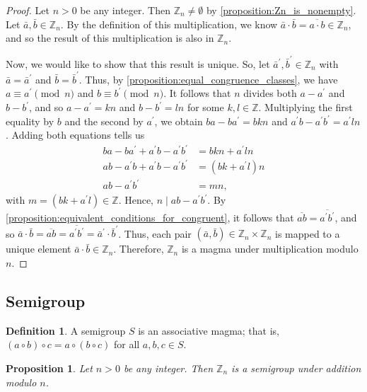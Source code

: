\documentclass[12pt, titlepage]{amsart}
\newcommand\Z{{\mathbb Z}}
\newtheorem{prop}{Proposition}[subsection]
\theoremstyle{definition}
\newtheorem{definition}{Definition}[subsection]
\begin{document}
	\begin{proof}
		Let $n > 0$ be any integer.
		Then $\Z_n \neq \emptyset$ by \cref{proposition:Zn_is_nonempty}.
		Let $\bar{a}, \bar{b} \in \Z_n$.
		By the definition of this multiplication, we know $\bar{a} \cdot \bar{b} = \overline{a \cdot b} \in \Z_n$, and so the result of this multiplication is also in $\Z_n$.
		
		Now, we would like to show that this result is unique.
		So, let $\bar{a}^\prime, \bar{b}^\prime \in \Z_n$ with $\bar{a} = \bar{a}^\prime$ and $\bar{b} = \bar{b}^\prime$.
		Thus, by \cref{proposition:equal_congruence_classes}, we have $a \equiv a^\prime \pmod n$ and $b \equiv b^\prime \pmod n$.
		It follows that $n$ divides both $a-a^\prime$ and $b-b^\prime$, and so $a-a^\prime = kn$ and $b-b^\prime = ln$ for some $k,l \in \Z$.
		Multiplying the first equality by $b$ and the second by $a^\prime$, we obtain $ba-ba^\prime = bkn$ and $a^\prime b-a^\prime b^\prime = a^\prime ln$. Adding both equations  tells us
		\begin{align*}
		ba-ba^\prime + a^\prime b-a^\prime b^\prime &= bkn + a^\prime ln \\
		ab-a^\prime b + a^\prime b-a^\prime b^\prime &= (bk + a^\prime l)n \\
		ab -a^\prime b^\prime &= mn,
		\end{align*}
		with $m = (bk + a^\prime l) \in \Z$.
		Hence, $n \mid ab -a^\prime b^\prime$. %
		By \cref{proposition:equivalent_conditions_for_congruent}, it follows that $\overline{ab} = \overline{a^\prime b^\prime}$, and so $\bar{a} \cdot \bar{b} = \overline{ab} = \overline{a^\prime b^\prime} = \bar{a}^\prime \cdot \bar{b}^\prime$.
		Thus, each pair $(\bar{a},\bar{b}) \in \Z_n \times \Z_n$ is mapped to a unique element $\bar{a} \cdot \bar{b} \in \Z_n$.
		Therefore, $\Z_n$ is a magma under multiplication modulo $n$.
	\end{proof}

	
	\subsection{Semigroup}
	
	\begin{definition}
		A semigroup $S$ is an associative magma; that is, $(a \circ b) \circ c = a \circ (b \circ c)$ for all $a,b,c \in S$.
	\end{definition}

	\begin{prop}\label{proposition:Zn_is_a_semigroup_under_addition_modulo_n}
		Let $n > 0$ be any integer. Then $\Z_n$ is a semigroup under addition modulo $n$.
	\end{prop}
	
\end{document}
